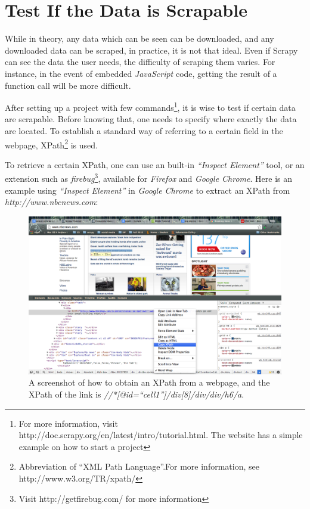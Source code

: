 \documentclass[12pt]{report}
\begin{document}
\section{Test If the Data is Scrapable}
While in theory, any data which can be seen can be downloaded, and any downloaded data can be scraped, in practice, it is not that ideal. Even if Scrapy can see the data the user needs, the difficulty of scraping them varies. For instance, in the event of embedded \textit{JavaScript} code, getting the result of a function call will be more difficult.

After setting up a project with few commands\footnote{For more information, visit http://doc.scrapy.org/en/latest/intro/tutorial.html. The website has a simple example on how to start a project}, it is wise to test if certain data are scrapable. Before knowing that, one needs to specify where exactly the data are located. To establish a standard way of referring to a certain field in the webpage, XPath\footnote{Abbreviation of ``XML Path Language''.For more information, see http://www.w3.org/TR/xpath/} is used.

To retrieve a certain XPath, one can use an built-in \textit{``Inspect Element''} tool, or an extension such as \textit{firebug}\footnote{Visit http://getfirebug.com/ for more information}, available for \textit{Firefox} and \textit{Google Chrome}. Here is an example using \textit{``Inspect Element''} in \textit{Google Chrome} to extract an XPath from \textit{http://www.nbcnews.com}:\\
\begin{figure}[htp]
\includegraphics[width=\textwidth]{XPath_example.png}
\caption[How to extract XPath]
{A screenshot of how to obtain an XPath from a webpage, and the XPath of the link is \textit{//*[@id=``cell1'']/div[8]/div/div/h6/a}.}
\end{figure}
\end{document}
